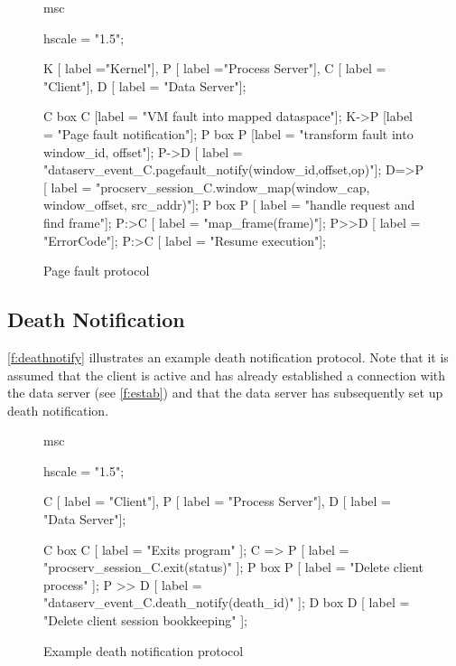 \begin{figure}[h]
  \begin{center}
    \begin{msc}
      msc {
        hscale = "1.5";
        
        K [ label ="Kernel"],
        P [ label ="Process Server"],
        C [ label = "Client"],
        D [ label = "Data Server"];
       
        C box C [label = "VM fault into mapped dataspace"];
        K->P [label = "Page fault notification"];
        P box P [label = "transform fault into window\_id, offset"];
        P->D [ label = "dataserv\_event\_C.pagefault\_notify(window\_id,offset,op)"];
        D=>P [ label = "procserv\_session\_C.window\_map(window\_cap, window\_offset, src\_addr)"];
        P box P [ label = "handle request and find frame"];
        P:>C [ label = "map\_frame(frame)"];
        P>>D [ label = "ErrorCode"];
        P:>C [ label = "Resume execution"];
      }
    \end{msc}
  \end{center}
  \caption{Page fault protocol}
  \label{f:pagefault}
\end{figure}

\clearpage
\subsection{Death Notification}
\autoref{f:deathnotify} illustrates an example death notification protocol. Note that it is assumed that the client is active and has already established a connection with the data server (see \autoref{f:estab}) and that the data server has subsequently set up death notification.

\begin{figure}[h]
\begin{center}
\begin{msc}
  msc {
    hscale = "1.5";

    C [ label = "Client"],
    P [ label = "Process Server"],
    D [ label = "Data Server"];
    
    C box C [ label = "Exits program" ];
    C => P [ label = "procserv\_session\_C.exit(status)" ];
    P box P [ label = "Delete client process" ];
    P >> D [ label = "dataserv\_event\_C.death\_notify(death\_id)" ];
    D box D [ label = "Delete client session bookkeeping" ];
  }
\end{msc}
\end{center}
\caption{Example death notification protocol}
\label{f:deathnotify}
\end{figure}

